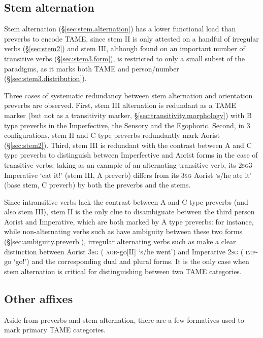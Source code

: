 \subsection{Stem alternation} \label{sec:stem.TAME}
Stem alternation (§\ref{sec:stem.alternation}) has a lower functional load than preverbs to encode TAME, since stem II is only attested on a handful of irregular verbs (§\ref{sec:stem2}) and stem III, although found on an important number of transitive verbs (§\ref{sec:stem3.form}), is restricted to only a small subset of the paradigms, as it marks both TAME and person/number (§\ref{sec:stem3.distribution}).

Three cases of systematic redundancy between stem alternation and orientation preverbs are observed. First, stem III alternation is redundant as a TAME marker (but not as a transitivity marker, §\ref{sec:transitivity.morphology}) with B type preverbs in the Imperfective, the Sensory and the Egophoric. Second, in 3\flobv{} configurations, stem II and C type preverbs redundantly mark Aorist (§\ref{sec:stem2}). Third, stem III is redundant with the contrast between A and C type preverbs to distinguish between Imperfective and Aorist forms in the case of transitive verbs; taking  as an example of an alternating transitive verb, its \textsc{2sg}\fl{}3 Imperative  `eat it!' (stem III, A preverb) differs from its \textsc{3sg}\flobv{} Aorist  `s/he ate it' (base stem, C preverb) by both the preverbs and the stems.

Since intransitive verbs lack the contrast between A and C type preverbs (and also stem III), stem II is  the only clue to disambiguate between the third person Aorist and Imperative, which are both marked by A type preverbs: for instance, while non-alternating verbs such as  have ambiguity between these two forms (§\ref{sec:ambiguity.preverb}), irregular alternating verbs such as  make a clear distinction between Aorist \textsc{3sg} ( \textsc{aor}-go[II] `s/he went') and Imperative \textsc{2sg} ( \textsc{imp}-go `go!') and the corresponding dual and plural forms. It is the only case when stem alternation is critical for distinguishing between two TAME categories.


\subsection{Other affixes} \label{sec:other.TAME}
Aside from preverbs and stem alternation, there are a few formatives used to mark primary TAME categories. 

